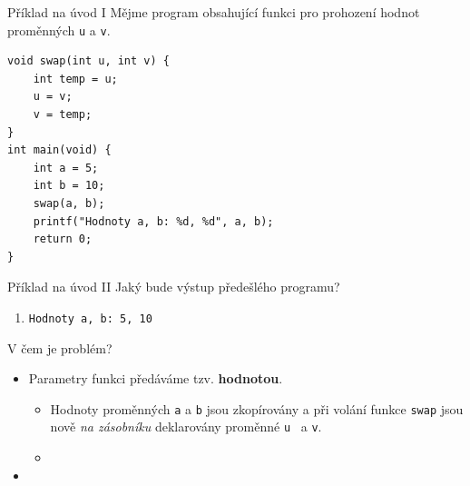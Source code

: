 \documentclass[14pt,aspectratio=169]{beamer}
\begin{document}
    \begin{frame}[t,fragile]{Příklad na úvod I}
        Mějme program obsahující funkci pro prohození hodnot proměnných \texttt{u} a \texttt{v}.
        \begin{lstlisting}
void swap(int u, int v) {
    int temp = u;
    u = v;
    v = temp;
}
int main(void) {
    int a = 5;
    int b = 10;
    swap(a, b);
    printf("Hodnoty a, b: %d, %d", a, b);
    return 0;
}
        \end{lstlisting}
    \end{frame}

    \begin{frame}[t]{Příklad na úvod II}
        Jaký bude výstup předešlého programu?
        \begin{enumerate}[label=(\alph*)]
            \item \texttt{Hodnoty a, b: 5, 10}
        \end{enumerate}
    \end{frame}

    \begin{frame}[t]{V čem je problém?}
        \begin{itemize}
            \item Parametry funkci předáváme tzv. \textbf{hodnotou}.
            \begin{itemize}
                \item Hodnoty proměnných \texttt{a} a \texttt{b} jsou zkopírovány a při volání funkce \texttt{swap} jsou nově \emph{na zásobníku} deklarovány proměnné \texttt{u} ~a \texttt{v}.
                \item {}
            \end{itemize}
            \item {}
        \end{itemize}
    \end{frame}
\end{document}
